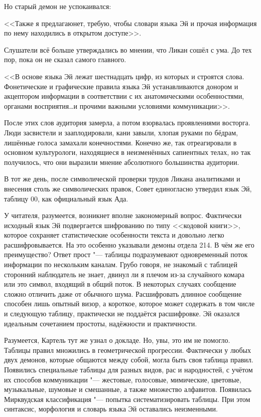 Но старый демон не успокаивался:

<<\ldotst Также я предлагаю\ldotst нет, требую, чтобы словари языка Эй и прочая информация по нему находились в открытом доступе>>.

Слушатели всё больше утверждались во мнении, что Ликан сошёл с ума.
До тех пор, пока он не сказал самого главного.

<<В основе языка Эй лежат шестнадцать цифр, из которых и строятся слова.
Фонетические и графические правила языка Эй устанавливаются донором и акцептором информации в соответствии с их анатомическими особенностями, органами восприятия\ldots и прочими важными условиями коммуникации>>.

После этих слов аудитория замерла, а потом взорвалась проявлениями восторга.
Люди засвистели и зааплодировали, кани завыли, хлопая руками по бёдрам, лишённые голоса замахали конечностями.
Конечно же, так отреагировали в основном культурологи, находящиеся в неизменённых сапиентных телах, но так получилось, что они выразили мнение абсолютного большинства аудитории.

В тот же день, после символической проверки трудов Ликана аналитиками и внесения столь же символических правок, Совет единогласно утвердил язык Эй, таблицу 00, как официальный язык Ада.

У читателя, разумеется, возникнет вполне закономерный вопрос.
Фактически исходный язык Эй подвергается шифрованию по типу <<кодовой книги>>, которое сохраняет статистические особенности текста и довольно легко расшифровывается.
На это особенно указывали демоны отдела 214.
В чём же его преимущество?
Ответ прост "--- таблицы подразумевают одновременный поток информации по нескольким каналам.
Грубо говоря, не знакомый с таблицей сторонний наблюдатель не знает, двинул ли я плечом из-за случайного комара или это символ, входящий в общий поток.
В некоторых случаях сообщение сложно отличить даже от обычного шума.
Расшифровать длинное сообщение способен лишь опытный визор, а короткое, которое может содержать в том числе и следующую таблицу, практически не поддаётся расшифровке.
Эй оказался идеальным сочетанием простоты, надёжности и практичности.

Разумеется, Картель тут же узнал о докладе.
Но, увы, это им не помогло.
Таблицы правил множились в геометрической прогрессии.
Фактически у любых двух демонов, которые общаются между собой, могла быть своя таблица правил.
Появились специальные таблицы для разных видов, рас и народностей, с учётом их способов коммуникации "--- жестовые, голосовые, мимические, цветовые, музыкальные, шумовые и смешанные, а также множество алфавитов.
Появилась Мирквудская классификация "--- попытка систематизировать таблицы.
При этом синтаксис, морфология и словарь языка Эй оставались неизменными.


